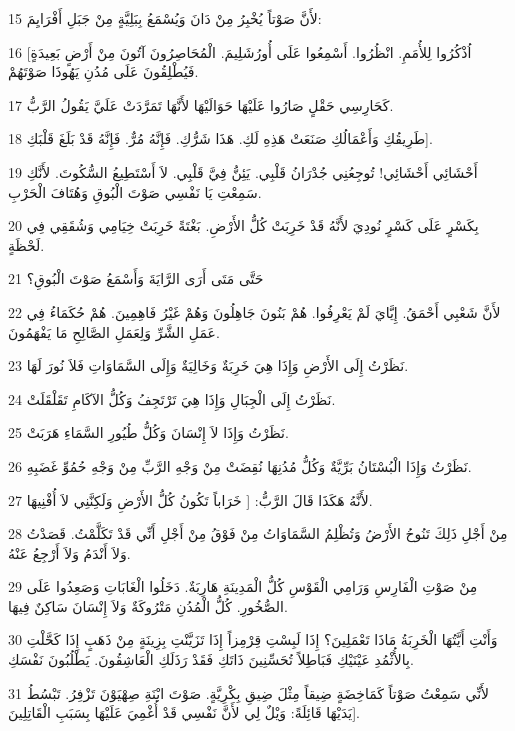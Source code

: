 \par 15 لأَنَّ صَوْتاً يُخْبِرُ مِنْ دَانَ وَيُسْمَعُ بِبَلِيَّةٍ مِنْ جَبَلِ أَفْرَايِمَ:
\par 16 [اُذْكُرُوا لِلأُمَمِ. انْظُرُوا. أَسْمِعُوا عَلَى أُورُشَلِيمَ. الْمُحَاصِرُونَ آتُونَ مِنْ أَرْضٍ بَعِيدَةٍ فَيُطْلِقُونَ عَلَى مُدُنِ يَهُوذَا صَوْتَهُمْ.
\par 17 كَحَارِسِي حَقْلٍ صَارُوا عَلَيْهَا حَوَالَيْهَا لأَنَّهَا تَمَرَّدَتْ عَلَيَّ يَقُولُ الرَّبُّ.
\par 18 طَرِيقُكِ وَأَعْمَالُكِ صَنَعَتْ هَذِهِ لَكِ. هَذَا شَرُّكِ. فَإِنَّهُ مُرٌّ. فَإِنَّهُ قَدْ بَلَغَ قَلْبَكِ].
\par 19 أَحْشَائِي أَحْشَائِي! تُوجِعُنِي جُدْرَانُ قَلْبِي. يَئِنُّ فِيَّ قَلْبِي. لاَ أَسْتَطِيعُ السُّكُوتَ. لأَنَّكِ سَمِعْتِ يَا نَفْسِي صَوْتَ الْبُوقِ وَهُتَافَ الْحَرْبِ.
\par 20 بِكَسْرٍ عَلَى كَسْرٍ نُودِيَ لأَنَّهُ قَدْ خَرِبَتْ كُلُّ الأَرْضِ. بَغْتَةً خَرِبَتْ خِيَامِي وَشُقَقِي فِي لَحْظَةٍ.
\par 21 حَتَّى مَتَى أَرَى الرَّايَةَ وَأَسْمَعُ صَوْتَ الْبُوقِ؟
\par 22 لأَنَّ شَعْبِي أَحْمَقُ. إِيَّايَ لَمْ يَعْرِفُوا. هُمْ بَنُونَ جَاهِلُونَ وَهُمْ غَيْرُ فَاهِمِينَ. هُمْ حُكَمَاءُ فِي عَمَلِ الشَّرِّ وَلِعَمَلِ الصَّالِحِ مَا يَفْهَمُونَ.
\par 23 نَظَرْتُ إِلَى الأَرْضِ وَإِذَا هِيَ خَرِبَةٌ وَخَالِيَةٌ وَإِلَى السَّمَاوَاتِ فَلاَ نُورَ لَهَا.
\par 24 نَظَرْتُ إِلَى الْجِبَالِ وَإِذَا هِيَ تَرْتَجِفُ وَكُلُّ الآكَامِ تَقَلْقَلَتْ.
\par 25 نَظَرْتُ وَإِذَا لاَ إِنْسَانَ وَكُلُّ طُيُورِ السَّمَاءِ هَرَبَتْ.
\par 26 نَظَرْتُ وَإِذَا الْبُسْتَانُ بَرِّيَّةٌ وَكُلُّ مُدُنِهَا نُقِضَتْ مِنْ وَجْهِ الرَّبِّ مِنْ وَجْهِ حُمُوِّ غَضَبِهِ.
\par 27 لأَنَّهُ هَكَذَا قَالَ الرَّبُّ: [ خَرَاباً تَكُونُ كُلُّ الأَرْضِ وَلَكِنَّنِي لاَ أُفْنِيهَا.
\par 28 مِنْ أَجْلِ ذَلِكَ تَنُوحُ الأَرْضُ وَتُظْلِمُ السَّمَاوَاتُ مِنْ فَوْقُ مِنْ أَجْلِ أَنِّي قَدْ تَكَلَّمْتُ. قَصَدْتُ وَلاَ أَنْدَمُ وَلاَ أَرْجِعُ عَنْهُ.
\par 29 مِنْ صَوْتِ الْفَارِسِ وَرَامِي الْقَوْسِ كُلُّ الْمَدِينَةِ هَارِبَةٌ. دَخَلُوا الْغَابَاتِ وَصَعِدُوا عَلَى الصُّخُورِ. كُلُّ الْمُدُنِ مَتْرُوكَةٌ وَلاَ إِنْسَانَ سَاكِنٌ فِيهَا.
\par 30 وَأَنْتِ أَيَّتُهَا الْخَرِبَةُ مَاذَا تَعْمَلِينَ؟ إِذَا لَبِسْتِ قِرْمِزاً إِذَا تَزَيَّنْتِ بِزِينَةٍ مِنْ ذَهَبٍ إِذَا كَحَّلْتِ بِالأُثْمُدِ عَيْنَيْكِ فَبَاطِلاً تُحَسِّنِينَ ذَاتَكِ فَقَدْ رَذَلَكِ الْعَاشِقُونَ. يَطْلُبُونَ نَفْسَكِ.
\par 31 لأَنِّي سَمِعْتُ صَوْتاً كَمَاخِضَةٍ ضِيقاً مِثْلَ ضِيقِ بِكْرِيَّةٍ. صَوْتَ ابْنَةِ صِهْيَوْنَ تَزْفِرُ. تَبْسُطُ يَدَيْهَا قَائِلَةً: وَيْلٌ لِي لأَنَّ نَفْسِي قَدْ أُغْمِيَ عَلَيْهَا بِسَبَبِ الْقَاتِلِينَ].

